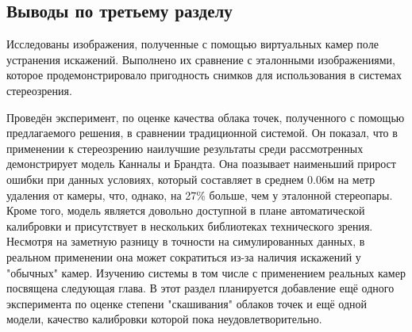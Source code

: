 \subsection{Выводы по третьему разделу}

Исследованы изображения, полученные с помощью виртуальных камер поле устранения искажений. Выполнено их сравнение 
с эталонными изображениями,  которое продемонстрировало пригодность снимков для использования в системах стереозрения.

Проведён эксперимент,
по оценке качества облака точек, полученного с помощью предлагаемого решения, в сравнении  традиционной системой. Он показал, что в применении к стереозрению 
наилучшие результаты среди рассмотренных демонстрирует модель Канналы и Брандта. 
Она поазывает наименьший прирост ошибки при данных условиях, который составляет в среднем 0.06м на метр удаления от камеры, что, однако, на 27\% больше, 
чем у эталонной стереопары. Кроме того, модель является довольно доступной в плане автоматической калибровки и присутствует в нескольких библиотеках 
технического зрения. Несмотря на заметную разницу в точности на симулированных данных, в реальном применении она может сократиться из-за наличия искажений
у "обычных" камер. Изучению системы в том числе с применением реальных камер посвящена следующая глава. 
В этот раздел планируется добавление ещё одного эксперимента по оценке степени "скашивания" облаков точек и ещё одной модели, качество калибровки которой пока
неудовлетворительно. 